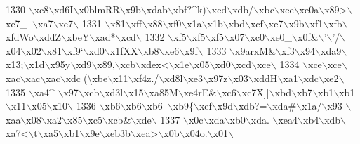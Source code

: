 \begin{DoxyCode}
1330 \textcolor{stringliteral}{\(\backslash\)xc8\(\backslash\)xd6I\(\backslash\)x0blmRR\(\backslash\)x9b\(\backslash\)xdab\(\backslash\)xbf?^k)\(\backslash\)xed\(\backslash\)xdb/\(\backslash\)xbc\(\backslash\)xee\(\backslash\)xe0a\(\backslash\)x89>\(\backslash\)xe7\_~\(\backslash\)xa7\(\backslash\)xe7\(\backslash\)}
1331 \textcolor{stringliteral}{\(\backslash\)x81\(\backslash\)xff\(\backslash\)x88\(\backslash\)xf0\(\backslash\)x1a\(\backslash\)x1b\(\backslash\)xbd\(\backslash\)xcf\(\backslash\)xe7\(\backslash\)x9b\(\backslash\)xf1\(\backslash\)xfb\(\backslash\)xfdWo\(\backslash\)xddZ\(\backslash\)xbeY\(\backslash\)xad*\(\backslash\)xcd\(\backslash\)}
1332 \textcolor{stringliteral}{\(\backslash\)xf5\(\backslash\)xf5\(\backslash\)xf5\(\backslash\)x07\(\backslash\)xc0\(\backslash\)xe0\_\(\backslash\)x0f&\(\backslash\)'\(\backslash\)'/\(\backslash\)x04\(\backslash\)x02\(\backslash\)x81\(\backslash\)xf9`\(\backslash\)xd0\(\backslash\)x1fXX\(\backslash\)xb8\(\backslash\)xe6\(\backslash\)x9f\(\backslash\)}
1333 \textcolor{stringliteral}{\(\backslash\)x9arxM&\(\backslash\)xf3\(\backslash\)x94\(\backslash\)xda9\(\backslash\)x13;\(\backslash\)x1d\(\backslash\)x95y\(\backslash\)xd9\(\backslash\)x89,\(\backslash\)xcb\(\backslash\)xdex<\(\backslash\)x1e\(\backslash\)x05\(\backslash\)xd0\(\backslash\)xcd\(\backslash\)xce\(\backslash\)}
1334 \textcolor{stringliteral}{\(\backslash\)xce\(\backslash\)xce\(\backslash\)xac\(\backslash\)xac\(\backslash\)xac\(\backslash\)xdc^^\(\backslash\)xbe\(\backslash\)x11\(\backslash\)xf4z./\(\backslash\)xd8l\(\backslash\)xe3\(\backslash\)x97z\(\backslash\)x03\(\backslash\)xddH\(\backslash\)xa1\(\backslash\)xdc\(\backslash\)xe2\(\backslash\)}
1335 \textcolor{stringliteral}{\(\backslash\)xa4^ \(\backslash\)x97\(\backslash\)xcb\(\backslash\)xd3l\(\backslash\)x15\(\backslash\)xa85M\(\backslash\)xe4rE&\(\backslash\)xc6\(\backslash\)xc7X]]\(\backslash\)xbd\(\backslash\)xb7\(\backslash\)xb1\(\backslash\)xb1\(\backslash\)x11\(\backslash\)x05\(\backslash\)x10\(\backslash\)}
1336 \textcolor{stringliteral}{\(\backslash\)xb6\(\backslash\)xb6\(\backslash\)xb6~\(\backslash\)xb9\{\(\backslash\)xef\(\backslash\)x9d\(\backslash\)xdb?=\(\backslash\)xda#\(\backslash\)x1a/\(\backslash\)x93-\(\backslash\)xaa\(\backslash\)x08\(\backslash\)xa2\(\backslash\)x85\(\backslash\)xc5\(\backslash\)xcb&\(\backslash\)xde\(\backslash\)}
1337 \textcolor{stringliteral}{\(\backslash\)x0c\(\backslash\)xda\(\backslash\)xb0\(\backslash\)xda. \(\backslash\)xea4\(\backslash\)xb4\(\backslash\)xdb\(\backslash\)xa7<\(\backslash\)t\(\backslash\)xa5\(\backslash\)xb1\(\backslash\)x9e\(\backslash\)xeb3b\(\backslash\)xea>\(\backslash\)x0b\(\backslash\)x04o.\(\backslash\)x01\(\backslash\)}

\end{DoxyCode}
